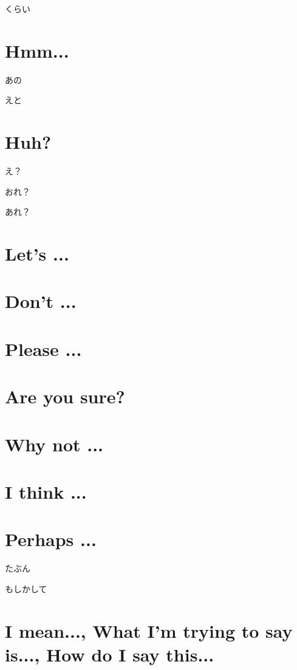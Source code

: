くらい

\section{Hmm...}

あの

えと

\section{Huh?}

え？

おれ？

あれ？

\section{Let's ...}

\section{Don't ...}

\section{Please ...}

\section{Are you sure?} 

\section{Why not ...}

\section{I think ...}

\section{Perhaps ...}

たぶん

もしかして

\section{I mean..., What I'm trying to say is..., How do I say this...}

